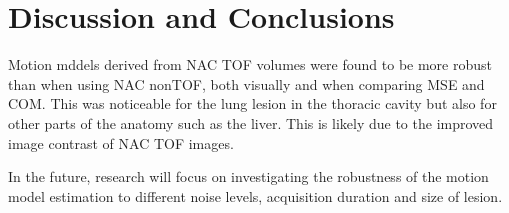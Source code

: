 \documentclass{IEEEtran}
\begin{document}
\section{Discussion and Conclusions}
Motion mddels derived from NAC TOF volumes were found to be more robust than when using NAC nonTOF, both visually and when comparing MSE and COM. This was noticeable for the lung lesion in the thoracic cavity but also for other parts of the anatomy such as the liver. This is likely due to the improved image contrast of NAC TOF images.

In the future, research will focus on investigating the robustness of the motion model estimation to different noise levels, acquisition duration and size of lesion.

\AtNextBibliography{\small}
\printbibliography
\end{document}
